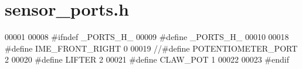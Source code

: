\section{sensor\+\_\+ports.\+h}
\label{sensor__ports_8h_source}

\begin{DoxyCode}
00001 
00008 \textcolor{preprocessor}{#ifndef \_PORTS\_H\_}
00009 \textcolor{preprocessor}{#define \_PORTS\_H\_}
00010 
00018 \textcolor{preprocessor}{#define IME\_FRONT\_RIGHT 0}
00019 \textcolor{comment}{//#define POTENTIOMETER\_PORT 2}
00020 \textcolor{preprocessor}{#define LIFTER 2}
00021 \textcolor{preprocessor}{#define CLAW\_POT 1}
00022 
00023 \textcolor{preprocessor}{#endif}
\end{DoxyCode}
